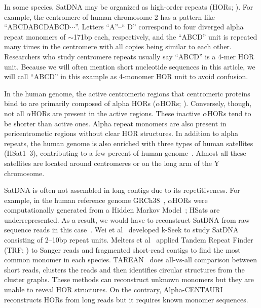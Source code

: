 \documentclass{bioinfo}
\newcommand{\revised}[1]{{\color{blue}#1}}
\begin{document}
In some species, SatDNA may be organized as high-order repeats
(HORs; \citealt{Miga:2019aa}).  For example, the centromere of human chromosome 2
has a pattern like ``{\sf ABCDABCDABCD$\cdots$}''. Letters ``{\sf A}''--``{\sf
D}'' correspond to four diverged alpha repeat monomers of $\sim$171bp each,
respectively, and the ``{\sf ABCD}'' unit is repeated many times in the
centromere with all copies being similar to each other. Researchers who study
centromere repeats usually say ``{\sf ABCD}'' is a 4-mer HOR unit. Because we
will often mention short nucleotide sequences in this article, we will call
``{\sf ABCD}'' in this example as 4-monomer HOR unit to avoid confusion.

\revised{In the human genome, the active centromeric regions that centromeric
proteins bind to are primarily composed of alpha HORs ($\alpha$HORs;
\citealt{Altemose:2022tv}). Conversely, though, not all $\alpha$HORs are
present in the active regions. These inactive $\alpha$HORs tend to be shorter
than active ones. Alpha repeat monomers are also present in pericentrometic
regions without clear HOR structures. In addition to alpha repeats, the human
genome is also enriched with three types of human satellites (HSat1--3),
contributing to a few percent of human genome~\citep{Altemose:2022vw}. Almost
all these satellites are located around centromeres or on the long arm of the Y
chromosome.}

SatDNA is often not assembled in long contigs due to its repetitiveness.
\revised{For example, in the human reference genome GRCh38~\citep{Schneider:2017aa},
$\alpha$HORs were computationally generated from a Hidden Markov
Model~\citep{Miga:2014aa}; HSats are underrepresented. As a result,}
we would have to reconstruct SatDNA from raw sequence reads in this
case~\citep{Lower:2018aa}.  Wei et al~\citep{Wei:2014vl} developed k-Seek to
study SatDNA consisting of 2--10bp repeat units. Melters et
al~\citep{Melters:2013va} applied Tandem Repeat Finder (TRF;
\citealt{Benson:1999aa}) to Sanger reads and fragmented short-read contigs to
find the most common monomer in each species.  TAREAN~\citep{Novak:2017wx} does
all-vs-all comparison between short reads, clusters the reads and then
identifies circular structures from the cluster graphs. These methods can
reconstruct unknown monomers but they are unable to reveal HOR structures. On
the contrary, Alpha-CENTAURI~\citep{Sevim:2016tl} reconstructs HORs from long
reads but it requires known monomer sequences.
\end{document}

